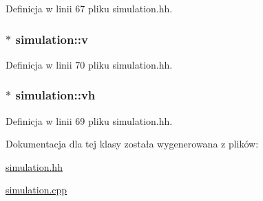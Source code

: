 Definicja w linii 67 pliku simulation.\+hh.

\hypertarget{classsimulation_a39dbad79b1b8667840638a35e839a3f7}{}
\subsubsection[{v}]{$\ast$ simulation\+::v\hspace{0.3cm}{\ttfamily [private]}}\label{classsimulation_a39dbad79b1b8667840638a35e839a3f7}


Definicja w linii 70 pliku simulation.\+hh.

\hypertarget{classsimulation_ae6da1f15728f49be7b0793700866ede9}{}
\subsubsection[{vh}]{$\ast$ simulation\+::vh\hspace{0.3cm}{\ttfamily [private]}}\label{classsimulation_ae6da1f15728f49be7b0793700866ede9}


Definicja w linii 69 pliku simulation.\+hh.



Dokumentacja dla tej klasy została wygenerowana z plików\+:\begin{DoxyCompactItemize}
\item 
\hyperlink{simulation_8hh}{simulation.\+hh}\item 
\hyperlink{simulation_8cpp}{simulation.\+cpp}\end{DoxyCompactItemize}
